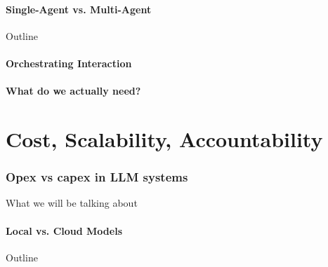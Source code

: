 \documentclass[24pt]{beamer}
\begin{document}
\subsection{Single-Agent vs. Multi-Agent}

\begin{frame}{Outline}
	\tableofcontents[currentsection]
\end{frame}

\subsection{Orchestrating Interaction}

\subsection{What do we actually need?}


\part{Cost, Scalability, Accountability}

\begin{frame}
	\partpage
\end{frame}


\section{Opex vs capex in LLM systems}

\begin{frame}{What we will be talking about}
   	\tableofcontents
\end{frame}


\subsection{Local vs. Cloud Models}

\begin{frame}{Outline}
	\tableofcontents[currentsection]
\end{frame}
\end{document}
